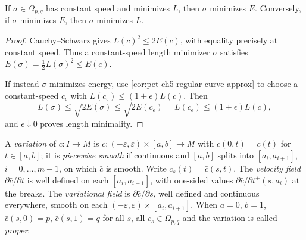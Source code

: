 \begin{proposition}
  \label{prop:pet-ch5-energy-length-minimizers}
  \leanok
  If $\sigma\in\Omega_{p,q}$ has constant speed and minimizes $L$, then $\sigma$
  minimizes $E$. Conversely, if $\sigma$ minimizes $E$, then $\sigma$ minimizes $L$.
\end{proposition}
\begin{proof}
  \leanok
  \sketch
  Cauchy--Schwarz gives $L(c)^2\le2E(c)$, with equality precisely at constant
  speed.  Thus a constant-speed length minimizer $\sigma$ satisfies
  $E(\sigma)=\tfrac12L(\sigma)^2\le E(c)$.

  If instead $\sigma$ minimizes energy, use
  \cref{cor:pet-ch5-regular-curve-approx} to choose a constant-speed $c_\epsilon$
  with $L(c_\epsilon)\le(1+\epsilon)L(c)$. Then
  \[
    L(\sigma)\le\sqrt{2E(\sigma)}\le\sqrt{2E(c_\epsilon)}=L(c_\epsilon)\le(1+\epsilon)L(c),
  \]
  and $\epsilon\downarrow0$ proves length minimality.
\end{proof}

\begin{definition}
  \label{def:pet-ch5-variation}
  \leanok
  A \emph{variation} of $c:I\to M$ is $\bar c:(-\varepsilon,\varepsilon)\times[a,b]\to
  M$ with $\bar c(0,t)=c(t)$ for $t\in[a,b]$; it is \emph{piecewise smooth} if
  continuous and $[a,b]$ splits into $[a_i,a_{i+1}]$, $i=0,\dots,m-1$, on which
  $\bar c$ is smooth. Write $c_s(t)=\bar c(s,t)$. The \emph{velocity field}
  $\partial\bar c/\partial t$ is well defined on each $[a_i,a_{i+1}]$, with one-sided
  values $\partial\bar c/\partial t^\pm(s,a_i)$ at the breaks. The \emph{variational
  field} is $\partial\bar c/\partial s$, well defined and continuous everywhere,
  smooth on each $(-\varepsilon,\varepsilon)\times[a_i,a_{i+1}]$. When $a=0$, $b=1$,
  $\bar c(s,0)=p$, $\bar c(s,1)=q$ for all $s$, all $c_s\in\Omega_{p,q}$ and the
  variation is called \emph{proper}.
\end{definition}

